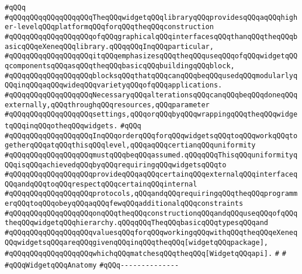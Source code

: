 \verb|#qQQq|\newline
\verb|#qQQqqQQqqQQqqQQqqQQqTheqQQqwidgetqQQqlibraryqQQqprovidesqQQqaqQQqhigher-levelqQQqplatformqQQqforqQQqtheqQQqconstruction|\newline
\verb|#qQQqqQQqqQQqqQQqqQQqofqQQqgraphicalqQQqinterfacesqQQqthanqQQqtheqQQqbasicqQQqeXeneqQQqlibrary.qQQqqQQqInqQQqparticular,|\newline
\verb|#qQQqqQQqqQQqqQQqqQQqitqQQqemphasizesqQQqtheqQQquseqQQqofqQQqwidgetqQQqcomponentsqQQqasqQQqtheqQQqbasicqQQqbuildingqQQqblock,|\newline
\verb|#qQQqqQQqqQQqqQQqqQQqblocksqQQqthatqQQqcanqQQqbeqQQqusedqQQqmodularlyqQQqinqQQqaqQQqwideqQQqvarietyqQQqofqQQqapplications.|\newline
\verb|#qQQqqQQqqQQqqQQqqQQqNecessaryqQQqalterationsqQQqcanqQQqbeqQQqdoneqQQqexternally,qQQqthroughqQQqresources,qQQqparameter|\newline
\verb|#qQQqqQQqqQQqqQQqqQQqsettings,qQQqorqQQqbyqQQqwrappingqQQqtheqQQqwidgetqQQqinqQQqotheqQQqwidgets.|\newline
\verb|#qQQq|\newline
\verb|#qQQqqQQqqQQqqQQqqQQqInqQQqorderqQQqforqQQqwidgetsqQQqtoqQQqworkqQQqtogetherqQQqatqQQqthisqQQqlevel,qQQqaqQQqcertianqQQquniformity|\newline
\verb|#qQQqqQQqqQQqqQQqqQQqmustqQQqbeqQQqassumed.qQQqqQQqThisqQQquniformityqQQqisqQQqachievedqQQqbyqQQqrequiringqQQqwidgetsqQQqto|\newline
\verb|#qQQqqQQqqQQqqQQqqQQqprovideqQQqaqQQqcertainqQQqexternalqQQqinterfaceqQQqandqQQqtoqQQqrespectqQQqcertainqQQqinternal|\newline
\verb|#qQQqqQQqqQQqqQQqqQQqprotocols,qQQqandqQQqrequiringqQQqtheqQQqprogrammerqQQqtoqQQqobeyqQQqaqQQqfewqQQqadditionalqQQqconstraints|\newline
\verb|#qQQqqQQqqQQqqQQqqQQqonqQQqtheqQQqconstructionqQQqandqQQquseqQQqofqQQqtheqQQqwidgetqQQqhierarchy.qQQqqQQqTheqQQqbasicqQQqtypesqQQqand|\newline
\verb|#qQQqqQQqqQQqqQQqqQQqvaluesqQQqforqQQqworkingqQQqwithqQQqtheqQQqeXeneqQQqwidgetsqQQqareqQQqgivenqQQqinqQQqtheqQQq[widgetqQQqpackage],|\newline
\verb|#qQQqqQQqqQQqqQQqqQQqwhichqQQqmatchesqQQqtheqQQq[WidgetqQQqapi].|\newline
\verb|#|\newline
\verb|#|\newline
\verb|#qQQqWidgetqQQqAnatomy|\newline
\verb|#qQQq--------------|\newline
